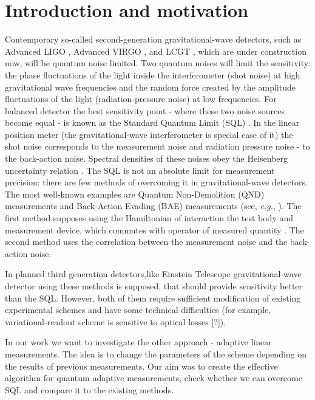 \section{Introduction and motivation}
Contemporary so-called second-generation gravitational-wave detectors, such as Advanced LIGO \cite{AdvLIGOsite, Harry2010},
 Advanced VIRGO \cite{AdvVIRGOsite}, and LCGT \cite{LCGTsite}, which are under construction now, will be quantum noise limited.
Two quantum noises will limit the sensitivity: the phase fluctuations of the light inside the interferometer (shot noise) at high gravitational wave frequencies
and the random force created by the amplitude fluctuations of the light (radiation-pressure noise) at low frequencies.
For balanced detector the best sensitivity point - where these two noise sources become equal -
 is known as the Standard Quantum Limit (SQL) \cite{92BookBrKh}.
In the linear position meter (the gravitational-wave interferometer is special case of it)
the shot noise corresponds to the measurement noise and radiation pressure noise - to the back-action noise.
 Spectral densities of these noises obey the Heisenberg uncertainty relation \cite{92BookBrKh}.
The SQL is not an absolute limit for measurement precision: there are few methods of overcoming it in gravitational-wave detectors. The most well-known examples are
Quantum Non-Demolition (QND) measurements and Back-Action Evading (BAE) measurements (see, {\it e.g.},
 \cite{90a1BrKh, Buonanno2001m, 01a2Kh, 02a1KiLeMaThVy}). The first method supposes using the Hamiltonian
 of interaction the test body and measurement device,
which commutes with operator of measured quantity \cite{77a1eBrKhVo, 90a1BrKh, 96a1BrKh, 92BookBrKh}. The second method uses the
correlation between the measurement noise and the back-action noise.\cite{Unruh1982, 87a1eKh, JaekelReynaud1990, Pace1993, 96a2eVyMa, 02a1KiLeMaThVy}

In planned third generation detectors,like Einstein Telescope gravitational-wave detector \cite{Sathyaprakash2011} using these methods is supposed,
 that should provide sensitivity better than the SQL. However, both of them require sufficient
 modification of existing experimental schemes and have some technical difficulties (for example, variational-readout scheme is sensitive to optical losses [?]).

In our work we want to investigate the other approach - adaptive linear measurements. The idea is to change
 the parameters of the scheme depending on the results of previous measurements. Our aim was to create the effective algorithm for quantum adaptive measurements,
 check whether we can overcome SQL and compare it to the existing methods.


